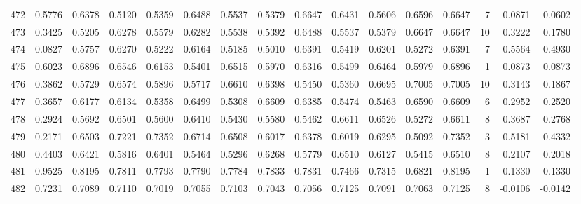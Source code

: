 \begin{tabular}{lrrrrrrrrrrrrrrr}
472 &      0.5776 &  0.6378 &  0.5120 &  0.5359 &  0.6488 &  0.5537 &  0.5379 &  0.6647 &  0.6431 &  0.5606 &   0.6596 &     0.6647 &      7 &                    0.0871 &                     0.0602 \\
473 &      0.3425 &  0.5205 &  0.6278 &  0.5579 &  0.6282 &  0.5538 &  0.5392 &  0.6488 &  0.5537 &  0.5379 &   0.6647 &     0.6647 &     10 &                    0.3222 &                     0.1780 \\
474 &      0.0827 &  0.5757 &  0.6270 &  0.5222 &  0.6164 &  0.5185 &  0.5010 &  0.6391 &  0.5419 &  0.6201 &   0.5272 &     0.6391 &      7 &                    0.5564 &                     0.4930 \\
475 &      0.6023 &  0.6896 &  0.6546 &  0.6153 &  0.5401 &  0.6515 &  0.5970 &  0.6316 &  0.5499 &  0.6464 &   0.5979 &     0.6896 &      1 &                    0.0873 &                     0.0873 \\
476 &      0.3862 &  0.5729 &  0.6574 &  0.5896 &  0.5717 &  0.6610 &  0.6398 &  0.5450 &  0.5360 &  0.6695 &   0.7005 &     0.7005 &     10 &                    0.3143 &                     0.1867 \\
477 &      0.3657 &  0.6177 &  0.6134 &  0.5358 &  0.6499 &  0.5308 &  0.6609 &  0.6385 &  0.5474 &  0.5463 &   0.6590 &     0.6609 &      6 &                    0.2952 &                     0.2520 \\
478 &      0.2924 &  0.5692 &  0.6501 &  0.5600 &  0.6410 &  0.5430 &  0.5580 &  0.5462 &  0.6611 &  0.6526 &   0.5272 &     0.6611 &      8 &                    0.3687 &                     0.2768 \\
479 &      0.2171 &  0.6503 &  0.7221 &  0.7352 &  0.6714 &  0.6508 &  0.6017 &  0.6378 &  0.6019 &  0.6295 &   0.5092 &     0.7352 &      3 &                    0.5181 &                     0.4332 \\
480 &      0.4403 &  0.6421 &  0.5816 &  0.6401 &  0.5464 &  0.5296 &  0.6268 &  0.5779 &  0.6510 &  0.6127 &   0.5415 &     0.6510 &      8 &                    0.2107 &                     0.2018 \\
481 &      0.9525 &  0.8195 &  0.7811 &  0.7793 &  0.7790 &  0.7784 &  0.7833 &  0.7831 &  0.7466 &  0.7315 &   0.6821 &     0.8195 &      1 &                   -0.1330 &                    -0.1330 \\
482 &      0.7231 &  0.7089 &  0.7110 &  0.7019 &  0.7055 &  0.7103 &  0.7043 &  0.7056 &  0.7125 &  0.7091 &   0.7063 &     0.7125 &      8 &                   -0.0106 &                    -0.0142 \\

\end{tabular}
